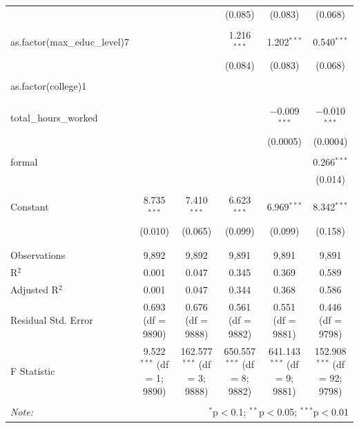\begin{table}[!htbp]
\begin{tabular}{@{\extracolsep{5pt}}lccccc}
  &  &  & (0.085) & (0.083) & (0.068) \\ 
  & & & & & \\ 
 as.factor(max\_educ\_level)7 &  &  & 1.216$^{***}$ & 1.202$^{***}$ & 0.540$^{***}$ \\ 
  &  &  & (0.084) & (0.083) & (0.068) \\ 
  & & & & & \\ 
 as.factor(college)1 &  &  &  &  &  \\ 
  &  &  &  &  &  \\ 
  & & & & & \\ 
 total\_hours\_worked &  &  &  & $-$0.009$^{***}$ & $-$0.010$^{***}$ \\ 
  &  &  &  & (0.0005) & (0.0004) \\ 
  & & & & & \\ 
 formal &  &  &  &  & 0.266$^{***}$ \\ 
  &  &  &  &  & (0.014) \\ 
  & & & & & \\ 
 Constant & 8.735$^{***}$ & 7.410$^{***}$ & 6.623$^{***}$ & 6.969$^{***}$ & 8.342$^{***}$ \\ 
  & (0.010) & (0.065) & (0.099) & (0.099) & (0.158) \\ 
  & & & & & \\ 
\hline \\[-1.8ex] 
Observations & 9,892 & 9,892 & 9,891 & 9,891 & 9,891 \\ 
R$^{2}$ & 0.001 & 0.047 & 0.345 & 0.369 & 0.589 \\ 
Adjusted R$^{2}$ & 0.001 & 0.047 & 0.344 & 0.368 & 0.586 \\ 
Residual Std. Error & 0.693 (df = 9890) & 0.676 (df = 9888) & 0.561 (df = 9882) & 0.551 (df = 9881) & 0.446 (df = 9798) \\ 
F Statistic & 9.522$^{***}$ (df = 1; 9890) & 162.577$^{***}$ (df = 3; 9888) & 650.557$^{***}$ (df = 8; 9882) & 641.143$^{***}$ (df = 9; 9881) & 152.908$^{***}$ (df = 92; 9798) \\ 
\hline 
\hline \\[-1.8ex] 
\textit{Note:}  & \multicolumn{5}{r}{$^{*}$p$<$0.1; $^{**}$p$<$0.05; $^{***}$p$<$0.01} \\ 
\end{tabular} 
\end{table} 
